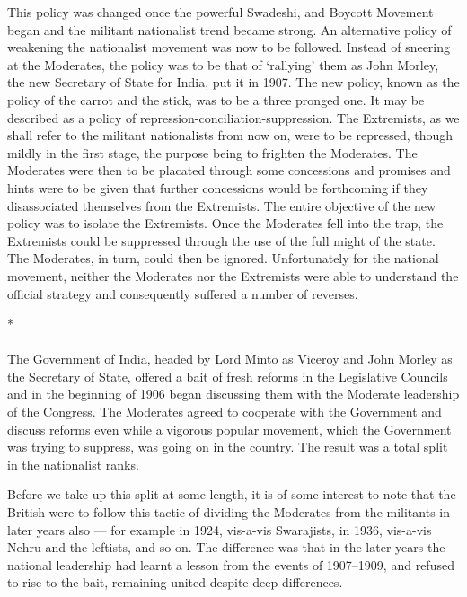 \begin{multicols}{2}
This policy was changed once the powerful Swadeshi, and Boycott Movement began and the militant nationalist trend became strong. An alternative policy of weakening the nationalist movement was now to be followed. Instead of sneering at the Moderates, the policy was to be that of `rallying' them as John Morley, the new Secretary of State for India, put it in 1907. The new policy, known as the policy of the carrot and the stick, was to be a three pronged one. It may be described as a policy of repression-conciliation-suppression. The Extremists, as we shall refer to the militant nationalists from now on, were to be repressed, though mildly in the first stage, the purpose being to frighten the Moderates. The Moderates were then to be placated through some concessions and promises and hints were to be given that further concessions would be forthcoming if they disassociated themselves from the Extremists. The entire objective of the new policy was to isolate the Extremists. Once the Moderates fell into the trap, the Extremists could be suppressed through the use of the full might of the state. The Moderates, in turn, could then be ignored. Unfortunately for the national movement, neither the Moderates nor the Extremists were able to understand the official strategy and consequently suffered a number of reverses.

\begin{center}*\end{center}

\paragraph*{}

The Government of India, headed by Lord Minto as Viceroy and John Morley as the Secretary of State, offered a bait of fresh reforms in the Legislative Councils and in the beginning of 1906 began discussing them with the Moderate leadership of the Congress. The Moderates agreed to cooperate with the Government and discuss reforms even while a vigorous popular movement, which the Government was trying to suppress, was going on in the country. The result was a total split in the nationalist ranks.

Before we take up this split at some length, it is of some interest to note that the British were to follow this tactic of dividing the Moderates from the militants in later years also --- for example in 1924, vis-a-vis Swarajists, in 1936, vis-a-vis Nehru and the leftists, and so on. The difference was that in the later years the national leadership had learnt a lesson from the events of 1907--1909, and refused to rise to the bait, remaining united despite deep differences.


\end{multicols}
